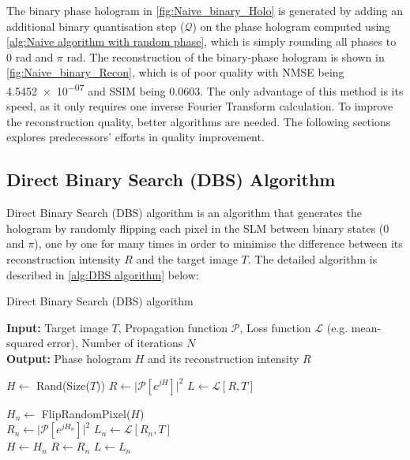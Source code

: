 The binary phase hologram in \cref{fig:Naive_binary_Holo} is generated by adding an additional binary quantisation step ($\mathcal{Q}$) on the phase hologram computed using \cref{alg:Naive algorithm with random phase}, which is simply rounding all phases to 0 rad and $\pi$ rad. The reconstruction of the binary-phase hologram is shown in \cref{fig:Naive_binary_Recon}, which is of poor quality with NMSE being \num{4.5452e-07} and SSIM being 0.0603. The only advantage of this method is its speed, as it only requires one inverse Fourier Transform calculation. To improve the reconstruction quality, better algorithms are needed. The following sections explores predecessors' efforts in quality improvement.

\newpage
\subsection{Direct Binary Search (DBS) Algorithm}\label{sec:Direct Binary Search (DBS) Algorithm}
Direct Binary Search (DBS) algorithm \cite{Seldowitz1987} is an algorithm that generates the hologram by randomly flipping each pixel in the SLM between binary states (0 and $\pi$), one by one for many times in order to minimise the difference between its reconstruction intensity $R$ and the target image $T$. The detailed algorithm is described in \cref{alg:DBS algorithm} below:
\begin{algorithm}[H]
  \caption{Direct Binary Search (DBS) algorithm}\label{alg:DBS algorithm}
  \textbf{Input:} Target image $T$, Propagation function $\mathcal{P}$, Loss function $\mathcal{L}$ (e.g. mean-squared error), Number of iterations $N$ \\
  \textbf{Output:} Phase hologram $H$ and its reconstruction intensity $R$
  \begin{algorithmic}
    \State $H \gets$ Rand(Size($T$))
    \State $R \gets \vert \mathcal{P}[e^{jH}] \vert ^2$
    \State $L \gets \mathcal{L} [R, T]$

    \State $H_n \gets$ FlipRandomPixel($H$)\\
    \State $R_n \gets \vert \mathcal{P}[e^{jH_n}] \vert ^2$
    \State $L_n \gets \mathcal{L} [R_n, T]$\\
    \State $H \gets H_n$
    \State $R \gets R_n$
    \State $L \gets L_n$
    \EndIf
    \EndFor
  \end{algorithmic}
\end{algorithm}

